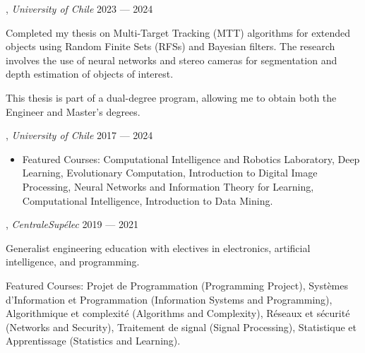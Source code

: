 , \textit{University of Chile} \hfill 2023 --- 2024
\begin{zitemize}
\item Completed my thesis on Multi-Target Tracking (MTT) algorithms for extended objects using Random Finite Sets (RFSs) and Bayesian filters. The research involves the use of neural networks and stereo cameras for segmentation and depth estimation of objects of interest.
\item This thesis is part of a dual-degree program, allowing me to obtain both the Engineer and Master's degrees.
\end{zitemize}

, \textit{University of Chile} \hfill 2017 --- 2024
\begin{itemize}
    \item Featured Courses: Computational Intelligence and Robotics Laboratory, Deep Learning, Evolutionary Computation, Introduction to Digital Image Processing, Neural Networks and Information Theory for Learning, Computational Intelligence, Introduction to Data Mining.
\end{itemize}

, \textit{CentraleSupélec} \hfill 2019 --- 2021
\begin{zitemize}
    \item Generalist engineering education with electives in electronics, artificial intelligence, and programming.
    \item Featured Courses: Projet de Programmation (Programming Project), Systèmes d’Information et Programmation (Information Systems and Programming), Algorithmique et complexité (Algorithms and Complexity), Réseaux et sécurité (Networks and Security), Traitement de signal (Signal Processing), Statistique et Apprentissage (Statistics and Learning).
\end{zitemize}

